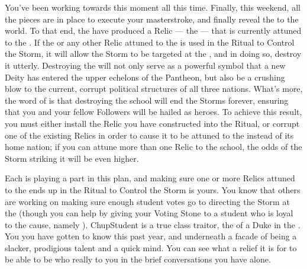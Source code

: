 \documentclass[char]{GL2020}
\begin{document}
You've been working towards this moment all this time. Finally, this weekend, all the pieces are in place to execute your masterstroke, and finally reveal the \pGoaties{} to the world. To that end, the \pGoaties{} have produced a Relic — the \iHorseshoe{} — that is currently attuned to the \pSchool{}. If the \iHorseshoe{} or any other Relic attuned to the \pSc{} is used in the Ritual to Control the Storm, it will allow the Storm to be targeted at the \pSchool{}, and in doing so, destroy it utterly. Destroying the \pSc{} will not only serve as a powerful symbol that a new Deity has entered the upper echelons of the Pantheon, but also be a crushing blow to the current, corrupt political structures of all three nations. What's more, the word of \cGenesis{} is that destroying the school will end the Storms forever, ensuring that you and your fellow Followers will be hailed as heroes. To achieve this result, you must either install the Relic you have constructed into the Ritual, or corrupt one of the existing Relics in order to cause it to be attuned to the \pSc{} instead of its home nation; if you can attune more than one Relic to the school, the odds of the Storm striking it will be even higher. 

Each \pGoatie{} is playing a part in this plan, and making sure one or more Relics attuned to the \pSc{} ends up in the Ritual to Control the Storm is yours. You know that others are working on making sure enough student votes go to directing the Storm at the \pSc{} (though you can help by giving your Voting Stone to a student who is loyal to the cause, namely \cChupStudent{\full}). ChupStudent{} is a true class traitor, the \cChupStudent{\child} of a Duke in the \pFarm{}. You you have gotten to know \cChupStudent{} this past year, and underneath a facade of being a slacker, \cChupStudent{\theyhave} prodigious talent and a quick mind. You can see what a relief it is for \cChupStudent{\them} to be able to be who \cChupStudent{\they} really \cChupStudent{\are} to you in the brief conversations you have alone.  
\end{document}
